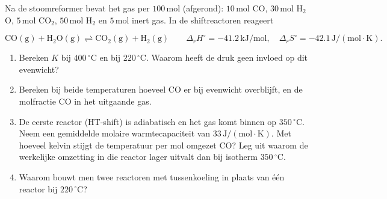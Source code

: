 \begin{oefening}
Na de stoomreformer bevat het gas per \(100\,\mathrm{mol}\) (afgerond): \(10\,\mathrm{mol}\) CO, \(30\,\mathrm{mol}\) H\(_2\)O, \(5\,\mathrm{mol}\) CO\(_2\), \(50\,\mathrm{mol}\) H\(_2\) en \(5\,\mathrm{mol}\) inert gas. In de shiftreactoren reageert

\[
\mathrm{CO(g) + H_2O(g) \rightleftharpoons CO_2(g) + H_2(g)}
\qquad \Delta_r H^\circ = -41.2\,\mathrm{kJ/mol},\quad \Delta_r S^\circ = -42.1\,\mathrm{J/(mol\cdot K)}.
\]

\begin{enumerate}
\item[(a)]
  Bereken \(K\) bij \(400\,^\circ\mathrm{C}\) en bij \(220\,^\circ\mathrm{C}\). Waarom heeft de druk geen invloed op dit evenwicht?
\item[(b)]
  Bereken bij beide temperaturen hoeveel CO er bij evenwicht overblijft, en de molfractie CO in het uitgaande gas.
\item[(c)]
  De eerste reactor (HT-shift) is adiabatisch en het gas komt binnen op \(350\,^\circ\mathrm{C}\). Neem een gemiddelde molaire warmtecapaciteit van \(33\,\mathrm{J/(mol\cdot K)}\). Met hoeveel kelvin stijgt de temperatuur per mol omgezet CO? Leg uit waarom de werkelijke omzetting in die reactor lager uitvalt dan bij isotherm \(350\,^\circ\mathrm{C}\).
\item[(d)]
  Waarom bouwt men twee reactoren met tussenkoeling in plaats van één reactor bij \(220\,^\circ\mathrm{C}\)?
\end{enumerate}
\end{oefening}
